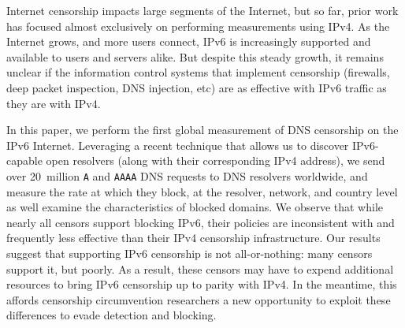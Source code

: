 Internet censorship impacts large segments of the Internet, but so far, prior
work has focused almost exclusively on performing measurements using IPv4. As
the Internet grows, and more users connect, IPv6 is increasingly supported and
available to users and servers alike. But despite this steady growth, it remains
unclear if the information control systems that implement censorship (firewalls,
deep packet inspection, DNS injection, etc) are as effective with IPv6 traffic
as they are with IPv4.

In this paper, we perform the first global measurement of DNS censorship on the
IPv6 Internet. Leveraging a recent technique that allows us to discover
IPv6-capable open resolvers (along with their corresponding IPv4 address), we
send over 20~million {\tt A} and {\tt AAAA} DNS requests to DNS resolvers
worldwide, and measure the rate at which they block, at the resolver, network,
and country level as well examine the characteristics of blocked domains.
%
We observe that while nearly all censors support blocking IPv6, their policies
are inconsistent with and frequently less effective than their IPv4 censorship
infrastructure. Our results suggest that supporting IPv6 censorship is not
all-or-nothing: many censors support it, but poorly.  As a result, these censors
may have to expend additional resources to bring IPv6 censorship up to parity
with IPv4. In the meantime, this affords censorship circumvention researchers a
new opportunity to exploit these differences to evade detection and blocking.
